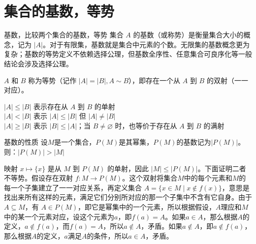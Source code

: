 \documentclass[lang=cn,11pt]{elegantbook}
\begin{document}
\section{集合的基数，等势}
\begin{definition}{基数，比较两个集合的基数，等势}
集合 $A$ 的基数（或称势）是衡量集合大小的概念，记为 $|A|$。对于有限集，基数就是集合中元素的个数。无限集的基数概念更为复杂；基数的等势定义不依赖选择公理，但基数全序性、任意集合可良序化等一般结论会涉及选择公理。

$A$ 和 $B$ 称为等势（记作 $|A| = |B|,A\sim B$），即存在一个从 $A$ 到 $B$ 的双射（一一对应）。

$|A| \leqslant |B|$ 表示存在从 $A$ 到 $B$ 的单射\\
$|A| < |B|$ 表示 $|A| \leqslant |B|$ 但 $|A| \neq |B|$\\
$|A| \geqslant |B|$ 表示 $|B| \leqslant |A|$；当 $B\ne\varnothing$ 时，也等价于存在从 $A$ 到 $B$ 的满射
\end{definition}
\begin{theorem}{基数的性质}
设$M$是一个集合，$P(M)$是其幂集，$P(M)$的基数记为$|P(M)|$。则：$|P(M)|>|M|$
\end{theorem}
映射 $x\mapsto\{x\}$ 是从 $M$ 到 $P(M)$ 的单射，因此 $|M|\leqslant|P(M)|$。下面证明二者不等势。假设存在双射 $f: M \to P(M)$。这个双射将集合$M$中的每个元素和$M$的每一个子集建立了一一对应关系，再定义集合 $A = \{ x \in M \mid x \notin f(x) \}$，意思是找出来所有这样的元素，满足它们分别所对应的那一个子集中不含有它自身。由于 $A \subseteq M$，有 $A \in P(M)$，即它是幂集中的一个元素，所以根据假设，$A$理应和$M$中的某一个元素对应，设这个元素为$a$，即$f(a) = A$。如果$a \in A$，那么根据$A$的定义，$a \notin f(a)$，而$f(a) = A$，所以$a \notin A$，矛盾。如果$a \notin A$，即$a \notin f(a)$，那么根据$A$的定义，$a$满足$A$的条件，所以$a \in A$，矛盾。
\end{document}
